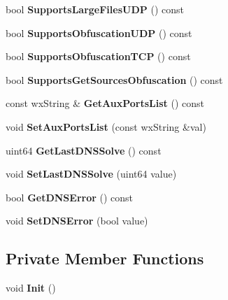 \begin{DoxyCompactItemize}
\item 
bool {\bfseries SupportsLargeFilesUDP} () const \label{classCServer_a92b9e89c94607e4bc53eb6640e73c433}

\item 
bool {\bfseries SupportsObfuscationUDP} () const \label{classCServer_ae3bb9e18a9a6400a248c6220c888562f}

\item 
bool {\bfseries SupportsObfuscationTCP} () const \label{classCServer_abd3089227bffe724b66ffcb8e50ce27b}

\item 
bool {\bfseries SupportsGetSourcesObfuscation} () const \label{classCServer_ab3edf14d208c1b24db9bbc204ae30ae9}

\item 
const wxString \& {\bfseries GetAuxPortsList} () const \label{classCServer_a1eda8cab7ade824646064dc23e03542c}

\item 
void {\bfseries SetAuxPortsList} (const wxString \&val)\label{classCServer_a8d6566f16b41198f7a57b49329eac85a}

\item 
uint64 {\bfseries GetLastDNSSolve} () const \label{classCServer_a37df098eb0a5c5b7901dd9dee9d74007}

\item 
void {\bfseries SetLastDNSSolve} (uint64 value)\label{classCServer_a781b02c670c355bda5a66f7f3fe90ac7}

\item 
bool {\bfseries GetDNSError} () const \label{classCServer_aefe9da4a4bb1116bc5bac0a81fe2c00f}

\item 
void {\bfseries SetDNSError} (bool value)\label{classCServer_a2964666663b69ff11e700e8d76ca3305}

\end{DoxyCompactItemize}
\subsection*{Private Member Functions}
\begin{DoxyCompactItemize}
\item 
void {\bfseries Init} ()\label{classCServer_a1937499c2b557914905bfcdf0dd99480}

\end{DoxyCompactItemize}
